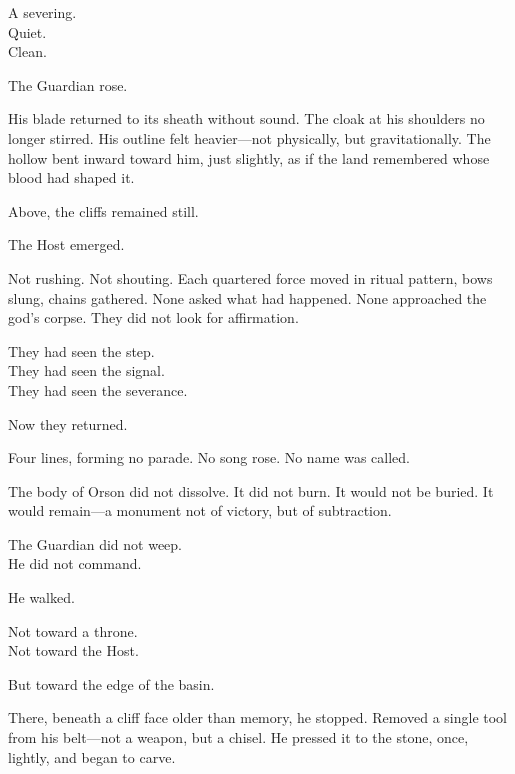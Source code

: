 \documentclass[12pt]{article}
\begin{document}
\vspace{0.5em}
A severing.\\
Quiet.\\
Clean.

\vspace{0.5em}
The Guardian rose.

\vspace{0.5em}
His blade returned to its sheath without sound. The cloak at his shoulders no longer stirred. His outline felt heavier---not physically, but gravitationally. The hollow bent inward toward him, just slightly, as if the land remembered whose blood had shaped it.

\vspace{0.5em}
Above, the cliffs remained still.

\vspace{0.5em}
The Host emerged.

\vspace{0.5em}
Not rushing. Not shouting. Each quartered force moved in ritual pattern, bows slung, chains gathered. None asked what had happened. None approached the god’s corpse. They did not look for affirmation.

\vspace{0.5em}
They had seen the step.\\
They had seen the signal.\\
They had seen the severance.

\vspace{0.5em}
Now they returned.

\vspace{0.5em}
Four lines, forming no parade. No song rose. No name was called.

\vspace{0.5em}
The body of Orson did not dissolve. It did not burn. It would not be buried. It would remain---a monument not of victory, but of subtraction.

\vspace{0.5em}
The Guardian did not weep.\\
He did not command.

\vspace{0.5em}
He walked.

\vspace{0.5em}
Not toward a throne.\\
Not toward the Host.

\vspace{0.5em}
But toward the edge of the basin.

\vspace{0.5em}
There, beneath a cliff face older than memory, he stopped. Removed a single tool from his belt---not a weapon, but a chisel. He pressed it to the stone, once, lightly, and began to carve.
\end{document}
